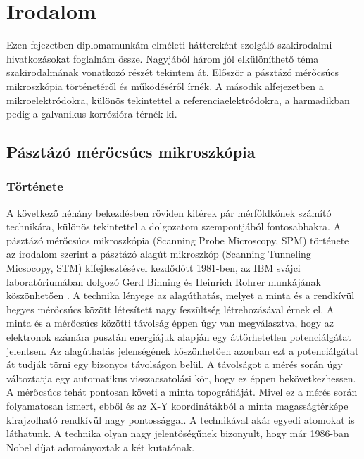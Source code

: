\chapter{Irodalom}
\pagestyle{headings}

Ezen fejezetben diplomamunkám elméleti háttereként szolgáló szakirodalmi hivatkozásokat foglalnám össze. Nagyjából három jól elkülöníthető téma szakirodalmának vonatkozó részét tekintem át. Először a pásztázó mérőcsúcs mikroszkópia történetéről és működéséről írnék. A második alfejezetben a mikroelektródokra, különös tekintettel a referenciaelektródokra, a harmadikban pedig a galvanikus korrózióra térnék ki.

\section{Pásztázó mérőcsúcs mikroszkópia}

\subsection{Története}




A következő néhány bekezdésben röviden kitérek pár mérföldkőnek számító technikára, különös tekintettel a dolgozatom szempontjából fontosabbakra. A pásztázó mérőcsúcs mikroszkópia (Scanning Probe Microscopy, SPM) története az irodalom szerint a pásztázó alagút mikroszkóp (Scanning Tunneling Micsocopy, STM) kifejlesztésével kezdődött 1981-ben, az IBM svájci laboratóriumában dolgozó Gerd Binning és Heinrich Rohrer munkájának köszönhetően \cite{binnig1982tunneling}. A technika lényege az alagúthatás, melyet a minta és a rendkívül hegyes mérőcsúcs között létesített nagy feszültség létrehozásával érnek el. A minta és a mérőcsúcs közötti távolság éppen úgy van megválasztva, hogy az elektronok számára pusztán energiájuk alapján egy áttörhetetlen potenciálgátat jelentsen. Az alagúthatás jelenségének köszönhetően azonban ezt a potenciálgátat át tudják törni egy bizonyos távolságon belül. A távolságot a mérés során úgy változtatja egy automatikus visszacsatolási kör, hogy ez éppen bekövetkezhessen. A mérőcsúcs tehát pontosan követi a minta topográfiáját. Mivel ez a mérés során folyamatosan ismert, ebből és az X-Y koordinátákból a minta magasságtérképe kirajzolható rendkívül nagy pontossággal. A technikával akár egyedi atomokat is láthatunk. A technika olyan nagy jelentőségűnek bizonyult, hogy már 1986-ban Nobel díjat adományoztak a két kutatónak.

